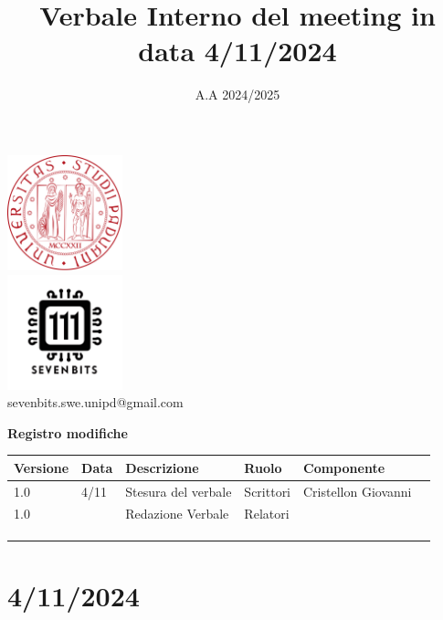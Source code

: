 \documentclass[12pt]{article}
\title{Verbale Interno del meeting in data 4/11/2024}
\date{A.A 2024/2025}
\begin{document}
\maketitle
\begin{center}
\includegraphics[width=0.25\textwidth]{LogoUnipd}\\
\includegraphics[width=0.25\textwidth]{Sevenbitslogo}\\
sevenbits.swe.unipd@gmail.com\\
\vspace{2mm}

\textbf{Registro modifiche}\\
\vspace{2mm}
\begin{tabular}{|l|l|l|l|l|l|}
\hline
\textbf{Versione} & \textbf{Data} & \textbf{Descrizione} & \textbf{Ruolo} & \textbf{Componente} \\
\hline
1.0 & 4/11 & Stesura del verbale & Scrittori & Cristellon Giovanni\\
\hline
1.0 &  & Redazione Verbale & Relatori &  \\
& & & & \\
& & & & \\
& & & & \\
\hline
\end{tabular}
\end{center}

\tableofcontents
\newpage
\section{4/11/2024}
\end{document}
